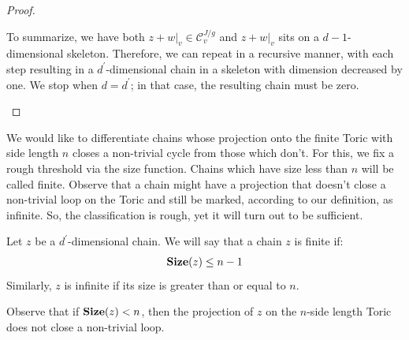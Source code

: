 \begin{proof}
\begin{enumerate}
To summarize, we have both $z + w|_{v} \in \mathcal{C}_{v}^{J/g}$ and $z+w|_{v}$ sits on a $d-1$-dimensional skeleton. Therefore, we can repeat in a recursive manner, with each step resulting in a $d^{\prime}$-dimensional chain in a skeleton with dimension decreased by one. We stop when $d = d^{\prime}$; in that case, the resulting chain must be zero.
  \end{enumerate}
\end{proof}

We would like to differentiate chains whose projection onto the finite Toric with side length $n$ closes a non-trivial cycle from those which don't. For this, we fix a rough threshold via the size function. Chains which have size less than $n$ will be called finite. Observe that a chain might have a projection that doesn't close a non-trivial loop on the Toric and still be marked, according to our definition, as infinite. So, the classification is rough, yet it will turn out to be sufficient.
\begin{definition}
  \label{def:finiteerr}
  Let $z$ be a $d^{\prime}$-dimensional chain. We will say that a chain $z$ is finite if:
  \begin{equation*}
    \begin{split}
        \Size{z} \le n-1     %
    \end{split}
  \end{equation*}
Similarly, $z$ is infinite if its size is greater than or equal to $n$.
\end{definition}

\begin{remark}
Observe that if $\mathbf{Size}(z) < n$, then the projection of $z$ on the $n$-side length Toric does not close a non-trivial loop.
\end{remark}


